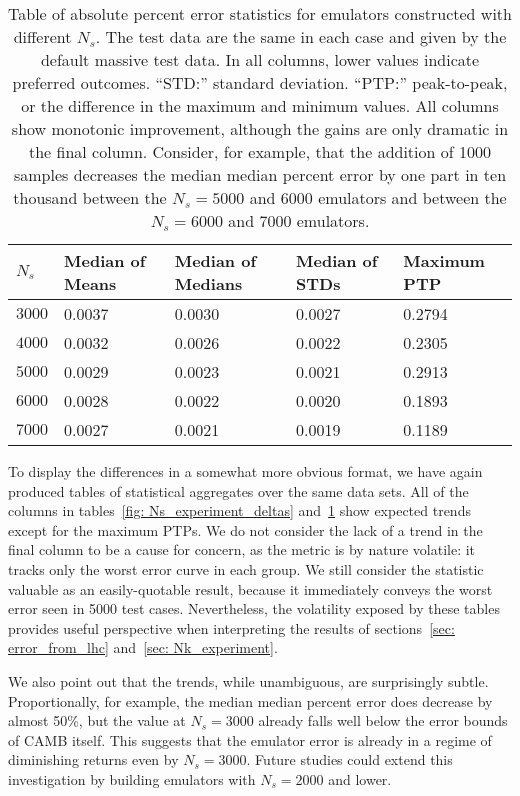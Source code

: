 \begin{table}[ht!]
\centering
\begin{tabular}{l|l|l|l|l}
\hline
$N_s$ & Median of Means & Median of Medians & Median of STDs & Maximum PTP \\ \hline
$3000$ & 0.0037 & 0.0030 & 0.0027 & 0.2794 \\
$4000$ & 0.0032 & 0.0026 & 0.0022 & 0.2305 \\
$5000$ & 0.0029 & 0.0023 & 0.0021 & 0.2913 \\
$6000$ & 0.0028 & 0.0022 & 0.0020 & 0.1893 \\
$7000$ & 0.0027 & 0.0021 & 0.0019 & 0.1189 \\
\end{tabular}
	\cprotect\caption[$N_s$ Experiment: Percent Error Statistics]{Table of
		absolute percent error statistics
		for emulators constructed with different $N_s$.
		The test data are the same in each case and given by the default
		massive test data.
		In all columns,
		lower values indicate preferred outcomes. ``STD:'' standard
		deviation. ``PTP:'' peak-to-peak, or the difference in the maximum
		and minimum values.
		All columns show monotonic improvement, although the gains are only
		dramatic in the final column. Consider, for example, that the
		addition of 1000 samples decreases the median median percent error
		by one part in ten thousand between the $N_s = 5000$ and 6000
		emulators and between the $N_s = 6000$ and 7000 emulators.}
 \label{tab: Ns_experiment_percerr_stats}
\end{table}

To display the differences in a somewhat more obvious format, we have again
produced tables of statistical aggregates over the same data sets. All of
the columns in tables~\ref{fig: Ns_experiment_deltas}
and~\ref{tab: Ns_experiment_percerr_stats} show expected trends except for
the maximum PTPs. We do not consider the lack of a trend in the final column
to be a cause for concern, as the metric is by nature volatile: it tracks only
the worst error curve in each group. We still consider the statistic
valuable as an easily-quotable result, because it immediately conveys the
worst error seen in 5000 test cases. Nevertheless, the volatility exposed by 
these tables provides useful perspective when interpreting the results of
sections~\ref{sec: error_from_lhc} and~\ref{sec: Nk_experiment}.

We also point out that the trends, while unambiguous, are surprisingly
subtle. Proportionally, for example, the median median percent error does
decrease by almost 50\%, but the value at $N_s=3000$ already falls well below
the error bounds of CAMB itself.
This suggests that the emulator error is already in a regime of
diminishing returns even by $N_s = 3000$. Future studies could extend this
investigation by building emulators with $N_s = 2000$ and lower.

